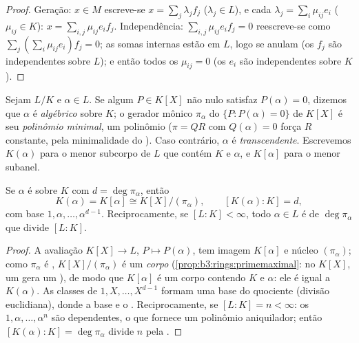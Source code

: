 \begin{proof}
Geração: $x \in M$ escreve-se $x = \sum_j \lambda_jf_j$ ($\lambda_j \in L$), e cada $\lambda_j = \sum_i \mu_{ij}e_i$ ($\mu_{ij} \in K$): $x = \sum_{i,j}\mu_{ij}e_if_j$.
Independência: $\sum_{i,j}\mu_{ij}e_if_j = 0$ reescreve-se como $\sum_j (\sum_i
\mu_{ij}e_i)f_j = 0$; as somas internas estão em
$L$, logo se anulam (os $f_j$ são independentes sobre $L$); e
então todos os $\mu_{ij} = 0$ (os $e_i$ são independentes sobre $K$).
\end{proof}

\begin{definition}\label{def:b3:galois:algebraic}
Sejam $L/K$ e $\alpha \in L$. Se algum $P \in K[X]$ não nulo satisfaz $P(\alpha) = 0$, dizemos
que $\alpha$ é \emph{algébrico} sobre
$K$; o gerador mônico $\pi_\alpha$ do  $\{P : P(\alpha) = 0\}$ de $K[X]$ é seu
\emph{polinômio minimal},
um polinômio  ($\pi = QR$ com $Q(\alpha) = 0$ força $R$ constante, pela
minimalidade do ). Caso contrário, $\alpha$ é
\emph{transcendente}. Escrevemos $K(\alpha)$ para o menor subcorpo de $L$
que contém $K$ e $\alpha$, e $K[\alpha]$ para o menor subanel.
\end{definition}

\begin{theorem}\label{thm:b3:galois:simple}
Se $\alpha$ é  sobre $K$ com $d = \deg\pi_\alpha$, então
\[
K(\alpha) = K[\alpha] \cong K[X]/(\pi_\alpha),
\qquad [K(\alpha) : K] = d,
\]
com base $1, \alpha, \dots, \alpha^{d-1}$. Reciprocamente, se $[L:K] < \infty$, todo $\alpha \in L$ é  de 
$\deg \pi_\alpha$ que divide $[L:K]$.
\end{theorem}

\begin{proof}
A avaliação $K[X] \to L$, $P \mapsto P(\alpha)$, tem imagem $K[\alpha]$ e núcleo $(\pi_\alpha)$; como $\pi_\alpha$ é
, $K[X]/(\pi_\alpha)$ é um \emph{corpo} (\cref{prop:b3:rings:primemaximal}: no  $K[X]$,
um  gera um ), de modo que $K[\alpha]$ é um corpo
contendo $K$ e $\alpha$: ele é igual a $K(\alpha)$. As classes de $1, X, \dots, X^{d-1}$
formam uma base do quociente (divisão euclidiana), donde a base e o
. Reciprocamente, se $[L:K]
= n < \infty$: os $1, \alpha, \dots, \alpha^n$ são dependentes, o que fornece
um polinômio aniquilador; então $[K(\alpha):K] =
\deg\pi_\alpha$ divide $n$ pela .
\end{proof}

